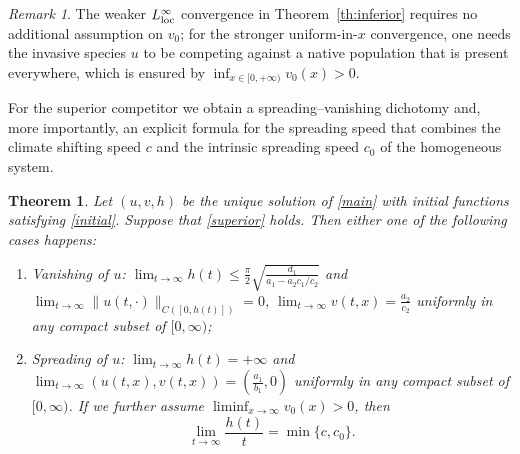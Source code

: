 \documentclass[reqno]{amsart}
\theoremstyle{plain}
\newtheorem{theorem}{Theorem}
\theoremstyle{definition}
\theoremstyle{remark}
\newtheorem{remark}{Remark}
\begin{document}
	\begin{remark}
		The weaker $L^\infty_{\rm loc}$ convergence in Theorem~\ref{th:inferior} requires no additional assumption on $v_0$; for the stronger uniform-in-$x$ convergence, one needs the invasive species $u$ to be competing against a native population that is present everywhere, which is ensured by $\inf_{x\in[0,+\infty)} v_0(x) > 0$.
	\end{remark}
	
	For the superior competitor we obtain a spreading–vanishing dichotomy and, more importantly, an explicit formula for the spreading speed that combines the climate shifting speed $c$ and the intrinsic spreading speed $c_0$ of the homogeneous system.
	
	\begin{theorem}\label{th:superior}
		Let $(u, v, h)$ be the unique solution of \eqref{main} with initial functions satisfying \eqref{initial}. Suppose that \eqref{superior} holds. Then either one of the following cases happens:
		\begin{enumerate}
			\item[(i)] \textit{Vanishing of $u$:} $\displaystyle\lim_{t\to\infty} h(t) \le \frac{\pi}{2}\sqrt{\frac{d_1}{a_1-a_2c_1/c_2}}$ and
			$\displaystyle\lim_{t\to\infty} \|u(t,\cdot)\|_{C([0,h(t)])} = 0$,
			$\displaystyle\lim_{t\to\infty} v(t,x) = \frac{a_2}{c_2}$ uniformly in any compact subset of $[0, \infty)$;
			\item[(ii)] \textit{Spreading of $u$:} $\displaystyle\lim_{t\to\infty} h(t) = +\infty$ and
			$\displaystyle\lim_{t\to\infty} (u(t,x), v(t,x)) = \left(\frac{a_1}{b_1},0\right)$ uniformly in any compact subset of $[0, \infty)$. If we further assume
			$\displaystyle\liminf_{x\to\infty} v_0(x) > 0$, then
			\[
			\lim_{t\to\infty} \frac{h(t)}{t} = \min\{c, c_0\}.
			\]
		\end{enumerate}
	\end{theorem}
	
\end{document}
